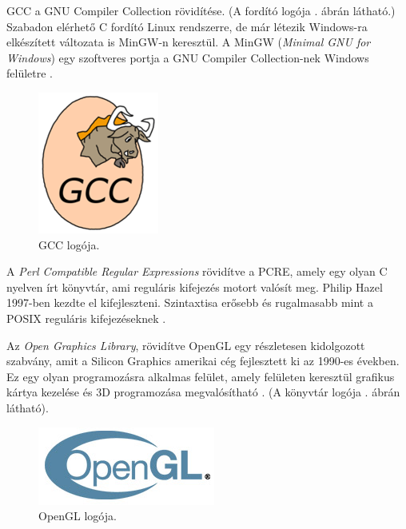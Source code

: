 
GCC a GNU Compiler Collection rövidítése. (A fordító logója . ábrán látható.) Szabadon elérhető C fordító Linux rendszerre, de már létezik Windows-ra elkészített változata is MinGW-n keresztül. A MinGW (\textit{Minimal GNU for Windows}) egy szoftveres portja a GNU Compiler Collection-nek Windows felületre \cite{gnu2003richard}.

\begin{figure}[h]
\centering
\includegraphics[scale=0.6]{images/gcc.png}
\caption{GCC logója.}
\label{fig:gcc}
\end{figure}


A \textit{Perl Compatible Regular Expressions} rövidítve a PCRE, amely egy olyan C nyelven írt könyvtár, ami reguláris kifejezés motort valósít meg. Philip Hazel 1997-ben kezdte el kifejleszteni. Szintaxtisa erősebb és rugalmasabb mint a POSIX reguláris kifejezéseknek \cite{philip1997pcre}.


Az \textit{Open Graphics Library}, rövidítve OpenGL egy részletesen kidolgozott szabvány, amit a Silicon Graphics amerikai cég fejlesztett ki az 1990-es években. Ez egy olyan programozásra alkalmas felület, amely felületen keresztül grafikus kártya kezelése és 3D programozása megvalósítható \cite{mason1999opengl}. (A könyvtár logója . ábrán látható).

\begin{figure}[h]
	\centering
	\includegraphics[scale=0.6]{images/opengl_logo.jpg}
	\caption{OpenGL logója.}
	\label{fig:opengl}
\end{figure}

\newpage

